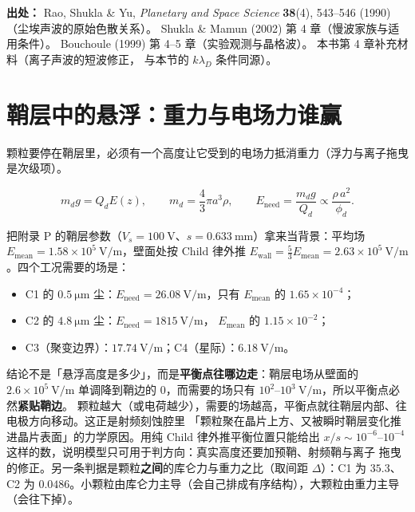 {\footnotesize
\textbf{出处：} Rao, Shukla \& Yu, \emph{Planetary and Space Science} \textbf{38}(4), 543--546
(1990)（尘埃声波的原始色散关系）。
Shukla \& Mamun (2002) 第 4 章（慢波家族与适用条件）。
Bouchoule (1999) 第 4--5 章（实验观测与晶格波）。
本书第 4 章补充材料（离子声波的短波修正，
与本节的 $k\lambda_D$ 条件同源）。
}

\section{鞘层中的悬浮：重力与电场力谁赢}
\label{sec:app-r-levitate}

颗粒要停在鞘层里，必须有一个高度让它受到的电场力抵消重力（浮力与离子拖曳是次级项）。

\begin{equation}
  m_d g = Q_d E(z),
  \qquad
  m_d = \frac{4}{3}\pi a^{3}\rho,
  \qquad
  E_{\mathrm{need}} = \frac{m_d g}{Q_d}
  \propto \frac{\rho\,a^{2}}{\phi_d}.
  \label{eq:app-r-balance}
\end{equation}

把附录 P 的鞘层参数（$V_s=100\ \mathrm{V}$、$s=0.633\ \mathrm{mm}$）拿来当背景：平均场
$E_{\mathrm{mean}}=1.58\times10^{5}\ \mathrm{V/m}$，壁面处按 Child 律外推
$E_{\mathrm{wall}}=\tfrac{5}{3}E_{\mathrm{mean}}=2.63\times10^{5}\ \mathrm{V/m}$。四个工况需要的场是：

\begin{itemize}
  \item C1 的 $0.5\ \mathrm{\mu m}$ 尘：$E_{\mathrm{need}}=26.08\ \mathrm{V/m}$，只有
        $E_{\mathrm{mean}}$ 的 $1.65\times10^{-4}$；
  \item C2 的 $4.8\ \mathrm{\mu m}$ 尘：$E_{\mathrm{need}}=1815\ \mathrm{V/m}$，
        $E_{\mathrm{mean}}$ 的 $1.15\times10^{-2}$；
  \item C3（聚变边界）：$17.74\ \mathrm{V/m}$；C4（星际）：$6.18\ \mathrm{V/m}$。
\end{itemize}

结论不是「悬浮高度是多少」，而是\textbf{平衡点往哪边走}：鞘层电场从壁面的 $2.6\times10^{5}\ \mathrm{V/m}$
单调降到鞘边的 $0$，而需要的场只有 $10^{2}$--$10^{3}\ \mathrm{V/m}$，所以平衡点必然\textbf{紧贴鞘边}。
颗粒越大（或电荷越少），需要的场越高，平衡点就往鞘层内部、往电极方向移动。这正是射频刻蚀腔里
「颗粒聚在晶片上方、又被瞬时鞘层变化推进晶片表面」的力学原因。用纯 Child 律外推平衡位置只能给出
$x/s\sim10^{-6}$--$10^{-4}$ 这样的数，说明模型只可用于判方向：真实高度还要加预鞘、射频鞘与离子
拖曳的修正。另一条判据是颗粒\textbf{之间}的库仑力与重力之比（取间距 $\Delta$）：C1 为 $35.3$、
C2 为 $0.0486$。小颗粒由库仑力主导（会自己排成有序结构），大颗粒由重力主导（会往下掉）。


